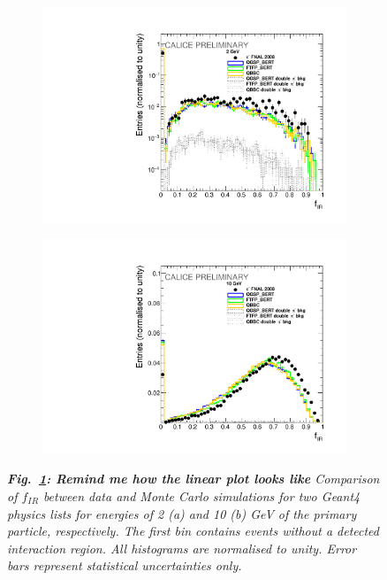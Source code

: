 \begin{figure}
	\centering
	\begin{subfigure}{0.5\textwidth}
		\centering
		\includegraphics[width=.90\linewidth]{ECAL/plots/e-ir-2.pdf}
		\caption{\label{fig:efr2} }
	\end{subfigure}%
	\begin{subfigure}{0.5\textwidth}
		\centering
		\includegraphics[width=.90\linewidth]{ECAL/plots/e-ir-10.pdf}
		\caption{\label{fig:efr10} }
	\end{subfigure}
	\caption{\label{fig:irexample} \sl {\bf Fig.~\ref{fig:efr2}: Remind me how the linear plot looks like} Comparison of $f_{IR}$ between data and Monte Carlo simulations for two {\sc Geant}4 physics lists for energies of 2 (a) and 10 (b) GeV of the primary particle, respectively. The first bin contains events without a detected interaction region. All histograms are normalised to unity. Error bars represent statistical uncertainties only.}
\end{figure}

